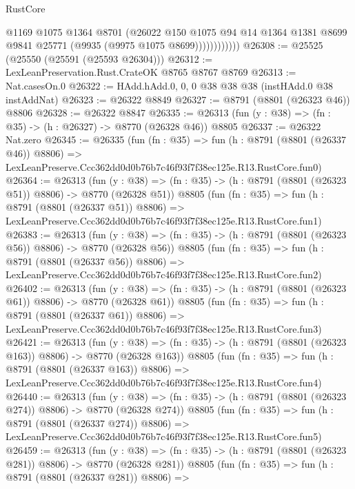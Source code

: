 \begin{lexlean}{RustCore}
\begin{coremodule}
                      @1169
                      @1075
                      @1364
                      @8701
                      (@26022
                        @150
                        @1075
                        @94
                        @14
                        @1364
                        @1381
                        @8699
                        @9841
                        @25771
                        (@9935 (@9975 @1075 @8699))))))))))))
@26308 := @25525 (@25550 (@25591 (@25593 @26304)))
@26312 := LexLeanPreservation.Rust.CrateOK @8765 @8767 @8769
@26313 := Nat.casesOn.{0}
@26322 := HAdd.hAdd.{0, 0, 0} @38 @38 @38 (instHAdd.{0} @38 instAddNat)
@26323 := @26322 @8849
@26327 := @8791 (@8801 (@26323 @46)) @8806
@26328 := @26322 @8847
@26335 := @26313 (fun (y : @38) => (fn : @35) -> (h : @26327) -> @8770 (@26328 @46)) @8805
@26337 := @26322 Nat.zero
@26345 := @26335
    (fun (fn : @35) =>
    fun (h : @8791 (@8801 (@26337 @46)) @8806) =>
    LexLeanPreserve.Ccc362dd0d0b76b7c46f93f7f38ec125e.R13.RustCore.fun0)
@26364 := @26313
    (fun (y : @38) => (fn : @35) -> (h : @8791 (@8801 (@26323 @51)) @8806) -> @8770 (@26328 @51))
    @8805
    (fun (fn : @35) =>
    fun (h : @8791 (@8801 (@26337 @51)) @8806) =>
    LexLeanPreserve.Ccc362dd0d0b76b7c46f93f7f38ec125e.R13.RustCore.fun1)
@26383 := @26313
    (fun (y : @38) => (fn : @35) -> (h : @8791 (@8801 (@26323 @56)) @8806) -> @8770 (@26328 @56))
    @8805
    (fun (fn : @35) =>
    fun (h : @8791 (@8801 (@26337 @56)) @8806) =>
    LexLeanPreserve.Ccc362dd0d0b76b7c46f93f7f38ec125e.R13.RustCore.fun2)
@26402 := @26313
    (fun (y : @38) => (fn : @35) -> (h : @8791 (@8801 (@26323 @61)) @8806) -> @8770 (@26328 @61))
    @8805
    (fun (fn : @35) =>
    fun (h : @8791 (@8801 (@26337 @61)) @8806) =>
    LexLeanPreserve.Ccc362dd0d0b76b7c46f93f7f38ec125e.R13.RustCore.fun3)
@26421 := @26313
    (fun (y : @38) => (fn : @35) -> (h : @8791 (@8801 (@26323 @163)) @8806) -> @8770 (@26328 @163))
    @8805
    (fun (fn : @35) =>
    fun (h : @8791 (@8801 (@26337 @163)) @8806) =>
    LexLeanPreserve.Ccc362dd0d0b76b7c46f93f7f38ec125e.R13.RustCore.fun4)
@26440 := @26313
    (fun (y : @38) => (fn : @35) -> (h : @8791 (@8801 (@26323 @274)) @8806) -> @8770 (@26328 @274))
    @8805
    (fun (fn : @35) =>
    fun (h : @8791 (@8801 (@26337 @274)) @8806) =>
    LexLeanPreserve.Ccc362dd0d0b76b7c46f93f7f38ec125e.R13.RustCore.fun5)
@26459 := @26313
    (fun (y : @38) => (fn : @35) -> (h : @8791 (@8801 (@26323 @281)) @8806) -> @8770 (@26328 @281))
    @8805
    (fun (fn : @35) =>
    fun (h : @8791 (@8801 (@26337 @281)) @8806) =>

\end{coremodule}
\end{lexlean}
